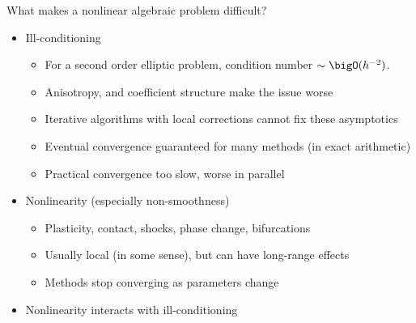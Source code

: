\begin{frame}{What makes a nonlinear algebraic problem difficult?}
  \begin{itemize}
  \item Ill-conditioning
    \begin{itemize}
    \item For a second order elliptic problem, condition number $\sim \bigO(h^{-2})$.
    \item Anisotropy, and coefficient structure make the issue worse
    \item Iterative algorithms with local corrections cannot fix these asymptotics
    \item Eventual convergence guaranteed for many methods (in exact arithmetic)
    \item Practical convergence too slow, worse in parallel
    \end{itemize}
  \item Nonlinearity (especially non-smoothness)
    \begin{itemize}
    \item Plasticity, contact, shocks, phase change, bifurcations
    \item Usually local (in some sense), but can have long-range effects
    \item Methods stop converging as parameters change
    \end{itemize}
  \item<2> Nonlinearity interacts with ill-conditioning
  \end{itemize}
\end{frame}
